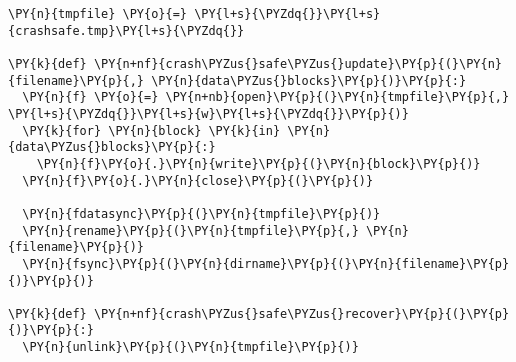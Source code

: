 \begin{BVerbatim}[commandchars=\\\{\}]
\PY{n}{tmpfile} \PY{o}{=} \PY{l+s}{\PYZdq{}}\PY{l+s}{crashsafe.tmp}\PY{l+s}{\PYZdq{}}

\PY{k}{def} \PY{n+nf}{crash\PYZus{}safe\PYZus{}update}\PY{p}{(}\PY{n}{filename}\PY{p}{,} \PY{n}{data\PYZus{}blocks}\PY{p}{)}\PY{p}{:}
  \PY{n}{f} \PY{o}{=} \PY{n+nb}{open}\PY{p}{(}\PY{n}{tmpfile}\PY{p}{,} \PY{l+s}{\PYZdq{}}\PY{l+s}{w}\PY{l+s}{\PYZdq{}}\PY{p}{)}
  \PY{k}{for} \PY{n}{block} \PY{k}{in} \PY{n}{data\PYZus{}blocks}\PY{p}{:}
    \PY{n}{f}\PY{o}{.}\PY{n}{write}\PY{p}{(}\PY{n}{block}\PY{p}{)}
  \PY{n}{f}\PY{o}{.}\PY{n}{close}\PY{p}{(}\PY{p}{)}

  \PY{n}{fdatasync}\PY{p}{(}\PY{n}{tmpfile}\PY{p}{)}
  \PY{n}{rename}\PY{p}{(}\PY{n}{tmpfile}\PY{p}{,} \PY{n}{filename}\PY{p}{)}
  \PY{n}{fsync}\PY{p}{(}\PY{n}{dirname}\PY{p}{(}\PY{n}{filename}\PY{p}{)}\PY{p}{)}

\PY{k}{def} \PY{n+nf}{crash\PYZus{}safe\PYZus{}recover}\PY{p}{(}\PY{p}{)}\PY{p}{:}
  \PY{n}{unlink}\PY{p}{(}\PY{n}{tmpfile}\PY{p}{)}
\end{BVerbatim}
